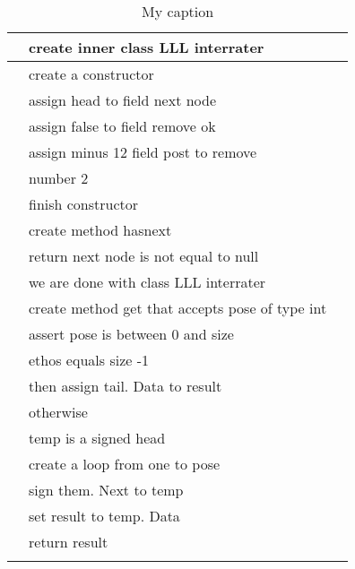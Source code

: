 \begin{table}[H]
\begin{tabular}{|l|l|l|}
                      & create inner class LLL interrater               &                        \\ \hline
                      & create a constructor                            &                        \\ \hline
                      & assign head to field next node                  &                        \\ \hline
                      & assign false to field remove ok                 &                        \\ \hline
                      & assign minus 12 field post to remove            &                        \\ \hline
                      & number 2                                        &                        \\ \hline
                      & finish constructor                              &                        \\ \hline
                      & create method hasnext                           &                        \\ \hline
                      & return next node is not equal to null           &                        \\ \hline
                      & we are done with class LLL interrater           &                        \\ \hline
                      & create method get that accepts pose of type int &                        \\ \hline
                      & assert pose is between 0 and size               &                        \\ \hline
                      & ethos equals size -1                            &                        \\ \hline
                      & then assign tail. Data to result                &                        \\ \hline
                      & otherwise                                       &                        \\ \hline
                      & temp is a signed head                           &                        \\ \hline
                      & create a loop from one to pose                  &                        \\ \hline
                      & sign them. Next to temp                         &                        \\ \hline
                      & set result to temp. Data                        &                        \\ \hline
                      & return result                                   &                        \\ \hline
                      &                                                 &                        \\ \hline
\end{tabular}
\caption{My caption}
\label{table7}
\end{table}
